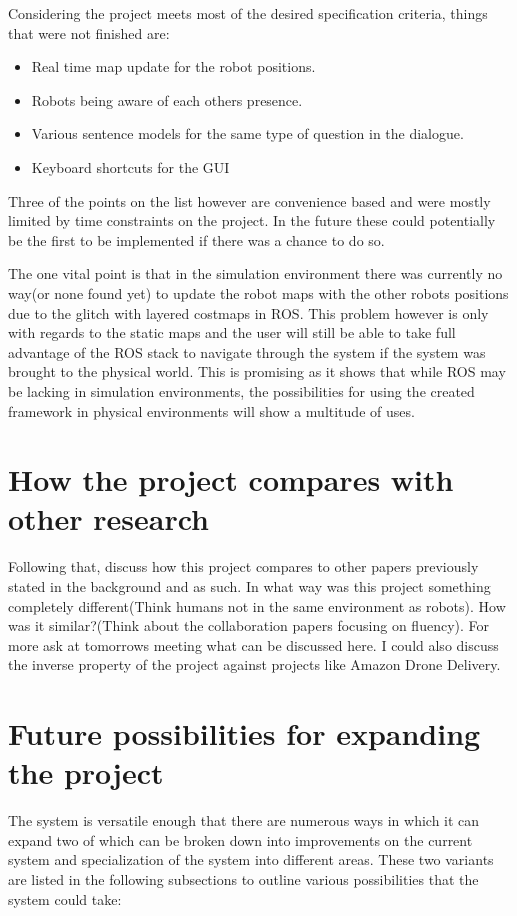     Considering the project meets most of the desired specification criteria, things that were not finished are:
    \begin{itemize}
      \item Real time map update for the robot positions.
      \item Robots being aware of each others presence.
      \item Various sentence models for the same type of question in the dialogue.
      \item Keyboard shortcuts for the GUI
    \end{itemize}

    Three of the points on the list however are convenience based and were mostly limited by time constraints on the project. In the future these could potentially be the first to be implemented if there was a chance to do so.

    The one vital point is that in the simulation environment there was currently no way(or none found yet) to update the robot maps with the other robots positions due to the glitch with layered costmaps in ROS. This problem however is only with regards to the static maps and the user will still be able to take full advantage of the ROS stack to navigate through the system if the system was brought to the physical world. This is promising as it shows that while ROS may be lacking in simulation environments, the possibilities for using the created framework in physical environments will show a multitude of uses.

  \section{How the project compares with other research}
    Following that, discuss how this project compares to other papers previously stated in the background and as such. In what way was this project something completely different(Think humans not in the same environment as robots). How was it similar?(Think about the collaboration papers focusing on fluency). For more ask at tomorrows meeting what can be discussed here. I could also discuss the inverse property of the project against projects like Amazon Drone Delivery.

  \section{Future possibilities for expanding the project}
    The system is versatile enough that there are numerous ways in which it can expand two of which can be broken down into improvements on the current system and specialization of the system into different areas. These two variants are listed in the following subsections to outline various possibilities that the system could take:

